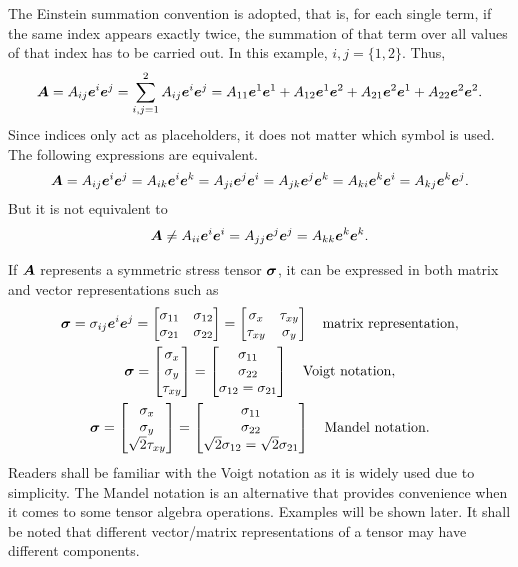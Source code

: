 The Einstein summation convention is adopted, that is, for each single term, if the same index appears exactly twice, the summation of that term over all values of that index has to be carried out. In this example, $i,j=\{1,2\}$. Thus,
\begin{gather}
\bm{A}=A_{ij}\bm{e}^i\bm{e}^j=\sum_{i,j=1}^{2}A_{ij}\bm{e}^i\bm{e}^j=A_{11}\bm{e}^1\bm{e}^1+A_{12}\bm{e}^1\bm{e}^2+A_{21}\bm{e}^2\bm{e}^1+A_{22}\bm{e}^2\bm{e}^2.
\end{gather}
Since indices only act as placeholders, it does not matter which symbol is used. The following expressions are equivalent.
\begin{gather}
\bm{A}=A_{ij}\bm{e}^i\bm{e}^j=A_{ik}\bm{e}^i\bm{e}^k=A_{ji}\bm{e}^j\bm{e}^i=A_{jk}\bm{e}^j\bm{e}^k=A_{ki}\bm{e}^k\bm{e}^i=A_{kj}\bm{e}^k\bm{e}^j.
\end{gather}
But it is not equivalent to
\begin{gather}
\bm{A}\neq{}A_{ii}\bm{e}^i\bm{e}^i=A_{jj}\bm{e}^j\bm{e}^j=A_{kk}\bm{e}^k\bm{e}^k.
\end{gather}

If $\bm{A}$ represents a symmetric stress tensor $\bm{\sigma}$, it can be expressed in both matrix and vector representations such as
\begin{gather}\label{eq:tensor_stress}
\bm{\sigma}=\sigma_{ij}\bm{e}^i\bm{e}^j=\begin{bmatrix}
\sigma_{11}&\sigma_{12}\\
\sigma_{21}&\sigma_{22}
\end{bmatrix}=\begin{bmatrix}
\sigma_x&\tau_{xy}\\
\tau_{xy}&\sigma_y
\end{bmatrix}\quad\text{matrix representation},\\
\bm{\sigma}=\begin{bmatrix}
\sigma_x\\\sigma_y\\\tau_{xy}
\end{bmatrix}=\begin{bmatrix}
\sigma_{11}\\\sigma_{22}\\\sigma_{12}=\sigma_{21}
\end{bmatrix}\quad\text{Voigt notation},\\
\bm{\sigma}=\begin{bmatrix}
\sigma_x\\\sigma_y\\\sqrt{2}\tau_{xy}
\end{bmatrix}=\begin{bmatrix}
\sigma_{11}\\\sigma_{22}\\\sqrt{2}\sigma_{12}=\sqrt{2}\sigma_{21}
\end{bmatrix}\quad\text{Mandel notation}.
\end{gather}
Readers shall be familiar with the Voigt notation as it is widely used due to simplicity. The Mandel notation is an alternative that provides convenience when it comes to some tensor algebra operations. Examples will be shown later. It shall be noted that different vector/matrix representations of a tensor may have different components.

